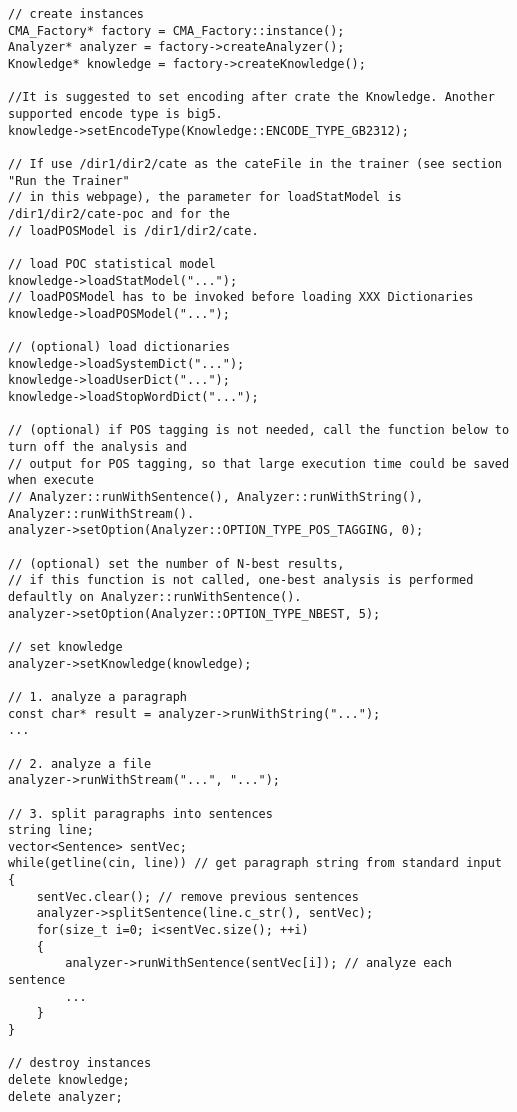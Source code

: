 \begin{Code}\begin{verbatim}// create instances
CMA_Factory* factory = CMA_Factory::instance();
Analyzer* analyzer = factory->createAnalyzer();
Knowledge* knowledge = factory->createKnowledge();

//It is suggested to set encoding after crate the Knowledge. Another supported encode type is big5.
knowledge->setEncodeType(Knowledge::ENCODE_TYPE_GB2312);

// If use /dir1/dir2/cate as the cateFile in the trainer (see section "Run the Trainer" 
// in this webpage), the parameter for loadStatModel is /dir1/dir2/cate-poc and for the 
// loadPOSModel is /dir1/dir2/cate.

// load POC statistical model
knowledge->loadStatModel("...");
// loadPOSModel has to be invoked before loading XXX Dictionaries
knowledge->loadPOSModel("...");

// (optional) load dictionaries
knowledge->loadSystemDict("...");
knowledge->loadUserDict("...");
knowledge->loadStopWordDict("...");
 
// (optional) if POS tagging is not needed, call the function below to turn off the analysis and 
// output for POS tagging, so that large execution time could be saved when execute 
// Analyzer::runWithSentence(), Analyzer::runWithString(), Analyzer::runWithStream().
analyzer->setOption(Analyzer::OPTION_TYPE_POS_TAGGING, 0);

// (optional) set the number of N-best results,
// if this function is not called, one-best analysis is performed defaultly on Analyzer::runWithSentence().
analyzer->setOption(Analyzer::OPTION_TYPE_NBEST, 5);

// set knowledge
analyzer->setKnowledge(knowledge);

// 1. analyze a paragraph
const char* result = analyzer->runWithString("...");
...

// 2. analyze a file
analyzer->runWithStream("...", "...");

// 3. split paragraphs into sentences
string line;
vector<Sentence> sentVec;
while(getline(cin, line)) // get paragraph string from standard input
{
    sentVec.clear(); // remove previous sentences
    analyzer->splitSentence(line.c_str(), sentVec);
    for(size_t i=0; i<sentVec.size(); ++i)
    {
        analyzer->runWithSentence(sentVec[i]); // analyze each sentence
        ...
    }
}

// destroy instances
delete knowledge;
delete analyzer;
\end{verbatim}
\end{Code}

 